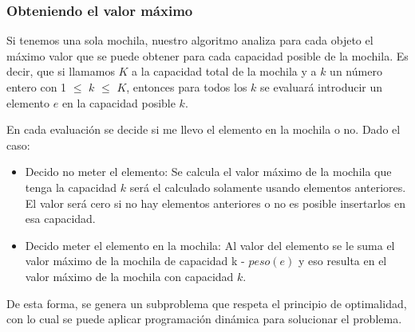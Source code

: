 \subsubsection*{Obteniendo el valor máximo}

Si tenemos una sola mochila, nuestro algoritmo analiza para cada objeto el máximo valor que se puede obtener para cada capacidad posible de la mochila. Es decir, que si llamamos $K$ a la capacidad total de la mochila y a $k$ un n\'umero entero con 1 $\leq$ $k$ $\leq$ $K$, entonces para todos los $k$ se evaluará introducir un elemento $e$ en la capacidad posible $k$.



En cada evaluación se decide si me llevo el elemento en la mochila o no. Dado el caso:

\begin{itemize}
	\item Decido no meter el elemento: Se calcula el valor máximo de la mochila que tenga la capacidad $k$ será el calculado solamente usando elementos anteriores. El valor será cero si no hay elementos anteriores o no es posible insertarlos en esa capacidad.
	\item Decido meter el elemento en la mochila: Al valor del elemento se le suma el valor máximo de la mochila de capacidad k - $peso(e)$ y eso resulta en el valor máximo de la mochila con capacidad $k$.
\end{itemize} 

 De esta forma, se genera un subproblema que respeta el principio de optimalidad, con lo cual se puede aplicar programación dinámica para solucionar el problema. \\ 
 
